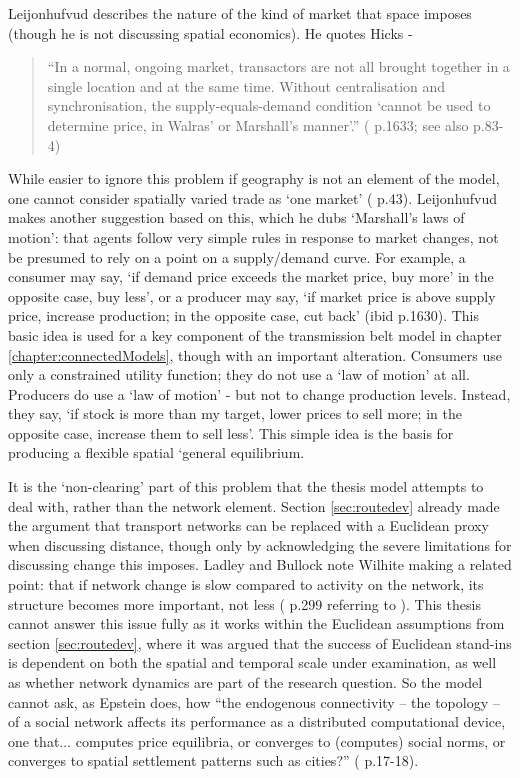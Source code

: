 Leijonhufvud describes the nature of the kind of market that space imposes (though he is not discussing spatial economics). He quotes Hicks -

\begin{quote}
``In a normal, ongoing market, transactors are not all brought together in a single location and at the same time. Without centralisation and synchronisation, the supply-equals-demand condition `cannot be used to determine price, in Walras' or Marshall's manner'.'' (\citealt{leijonhufvud_agent-based_2006} p.1633; see also \citealt{ladley_effects_2007} p.83-4) 
\end{quote}

While easier to ignore this problem if geography is not an element of the model, one cannot consider spatially varied trade as `one market' (\citealt{isard_location_1956} p.43). Leijonhufvud makes another suggestion based on this, which he dubs `Marshall's laws of motion': that agents follow very simple rules in response to market changes, not be presumed to rely on a point on a supply/demand curve. For example, a consumer may say, `if demand price exceeds the market price, buy more' in the opposite case, buy less', or a producer may say, `if market price is above supply price, increase production; in the opposite case, cut back' (ibid p.1630). This basic idea is used for a key component of the transmission belt model in chapter \ref{chapter:connectedModels}, though with an important alteration. Consumers use only a constrained utility function; they do not use a `law of motion' at all. Producers do use a `law of motion' - but not to change production levels. Instead, they say, `if stock is more than my target, lower prices to sell more; in the opposite case, increase them to sell less'. This simple idea is the basis for producing a flexible spatial `general equilibrium.

It is the `non-clearing' part of this problem that the thesis model attempts to deal with, rather than the network element. Section \ref{sec:routedev} already made the argument that transport networks can be replaced with a Euclidean proxy when discussing distance, though only by acknowledging the severe limitations for discussing change this imposes. Ladley and Bullock note Wilhite making a related point: that if network change is slow compared to activity on the network, its structure becomes more important, not less (\citealt{ladley_strategic_2008} p.299 referring to \citealt{wilhite_economic_2006}). This thesis cannot answer this issue fully as it works within the Euclidean assumptions from section \ref{sec:routedev}, where it was argued that the success of Euclidean stand-ins is dependent on both the spatial and temporal scale under examination, as well as whether network dynamics are part of the research question. So the model cannot ask, as Epstein does, how ``the endogenous connectivity – the topology – of a social network affects its performance as a distributed computational device, one that... computes price equilibria, or converges to (computes) social norms, or converges to spatial settlement patterns such as cities?'' (\citealt{epstein_generative_2006} p.17-18). 

